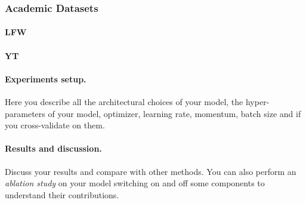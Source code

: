 \subsubsection{Academic Datasets}
\paragraph{LFW}
\paragraph{YT}

\paragraph{Experiments setup.}
Here you describe all the architectural choices of your model, the hyper-parameters of your model, \eg optimizer, learning rate, momentum, batch size and if you cross-validate on them. 

\paragraph{Results and discussion.}
Discuss your results and compare with other methods. You can also perform an \emph{ablation study} on your model switching on and off some components to understand their contributions.
